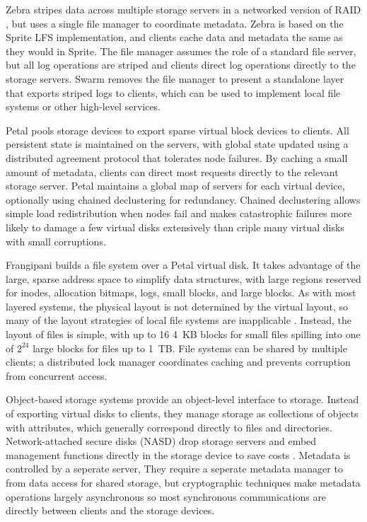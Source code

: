 Zebra \cite{hartman93} stripes data across multiple storage servers in a networked version of RAID \cite{patterson}, but uses a single file manager to coordinate metadata. Zebra is based on the Sprite LFS implementation, and clients cache data and metadata the same as they would in Sprite. The file manager assumes the role of a standard file server, but all log operations are striped and clients direct log operations directly to the storage servers. Swarm \cite{hartman99} removes the file manager to present a standalone layer that exports striped logs to clients, which can be used to implement local file systems or other high-level services.

Petal \cite{lee95,lee96} pools storage devices to export sparse virtual block devices to clients. All persistent state is maintained on the servers, with global state updated using a distributed agreement protocol that tolerates node failures. By caching a small amount of metadata, clients can direct most requests directly to the relevant storage server. Petal maintains a global map of servers for each virtual device, optionally using chained declustering for redundancy. Chained declustering \cite{hsiao} allows simple load redistribution when nodes fail and makes catastrophic failures more likely to damage a few virtual disks extensively than criple many virtual disks with small corruptions.

Frangipani \cite{thekkath} builds a file system over a Petal virtual disk. It takes advantage of the large, sparse address space to simplify data structures, with large regions reserved for inodes, allocation bitmaps, logs, small blocks, and large blocks. As with most layered systems, the physical layout is not determined by the virtual layout, so many of the layout strategies of local file systems are inapplicable \cite{stein05}. Instead, the layout of files is simple, with up to 16 4~KB blocks for small files spilling into one of $2^24$ large blocks for files up to 1~TB. File systems can be shared by multiple clients; a distributed lock manager coordinates caching and prevents corruption from concurrent access.

Object-based storage systems \cite{factor,mesnier} provide an object-level interface to storage. Instead of exporting virtual disks to clients, they manage storage as collections of objects with attributes, which generally correspond directly to files and directories. Network-attached secure disks (NASD) drop storage servers and embed management functions directly in the storage device to save costs \cite{gibson97,gibson98a}. Metadata is controlled by a seperate server, They require a seperate metadata manager to from data access for shared storage, but cryptographic techniques make metadata operations largely asynchronous so most synchronous communications are directly between clients and the storage devices. 

